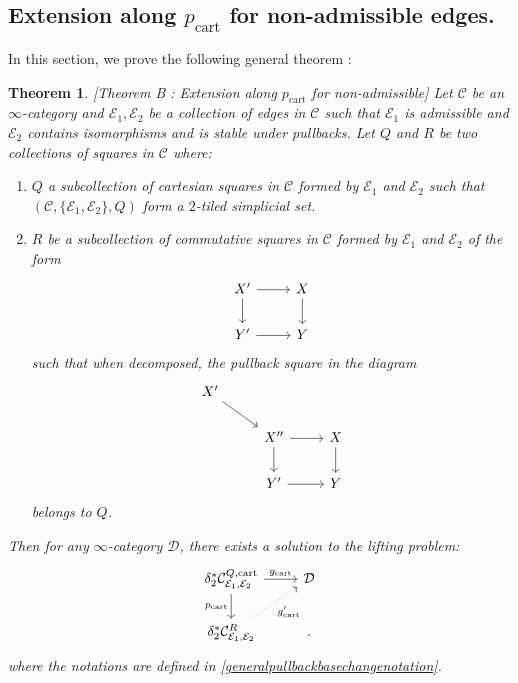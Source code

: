 \documentclass[14pt]{article}
\newtheorem{theorem}{Theorem}[subsection]
\theoremstyle{definition}
\newcommand{\E}{\mathcal{E}}
\newcommand{\D}{\mathcal{D}}
\newcommand{\op}[1]{\operatorname{#1}}
\newcommand{\dd}{\delta}
\newcommand{\Ca}{\mathcal{C}}
\numberwithin{subsection}{section}
\begin{document}
\subsection{ Extension along $p_{\op{cart}}$ for non-admissible edges.}
In this section, we prove the following general theorem :

  \begin{theorem}\label{Theorem: Ext along non adm edges}[Theorem B : Extension along $p_{\op{cart}}$ for non-admissible]\label{thmBvariant}
    		Let $\Ca$ be an $\infty$-category and $\E_1,\E_2$ be a collection of edges in $\Ca$ such that   $\E_1$ is admissible and $\E_2$ contains isomorphisms and is stable under pullbacks. Let $Q$ and $R$ be two collections of squares in $\Ca$ where:
            \begin{enumerate}
                \item $Q$ a subcollection of cartesian squares in $\Ca$ formed by $\E_1$ and $\E_2$ such that $(\Ca,\{\E_1,\E_2\},Q)$ form a $2$-tiled simplicial set.
                \item $R$ be a subcollection of commutative squares in $\Ca$ formed by $\E_1$ and $\E_2$ of the form \begin{equation}
    \begin{tikzcd}
        X' \arrow[r]\arrow[d] & X \arrow[d]\\
        Y' \arrow[r] & Y
    \end{tikzcd}
\end{equation}
such that when decomposed, the pullback square in the diagram 
\begin{equation}
    \begin{tikzcd}
        X' \arrow[dr] & {} & {}\\
        {} & X'' \arrow[r] \arrow[d] & X \arrow[d] \\
        {} & Y' \arrow[r]  & Y
    \end{tikzcd}
\end{equation}
belongs to $Q$.
            \end{enumerate}
             Then for any $\infty$-category $\D$, there exists a solution to the lifting problem:
\begin{equation}
\begin{tikzcd}
    \dd^*_2\Ca^{Q,\op{cart}}_{\E_1,\E_2} \arrow[d,"p_{\op{cart}}",swap] \arrow[r,"g_{\op{cart}}"] &\D\\
    \dd^*_2\Ca^R_{\E_1,\E_2} \arrow[ur,"g'_{\op{cart}}",swap,dotted] & {}.
    \end{tikzcd}
\end{equation}
where the notations are defined in \cref{generalpullbackbasechangenotation}.
\end{theorem}
\end{document}
